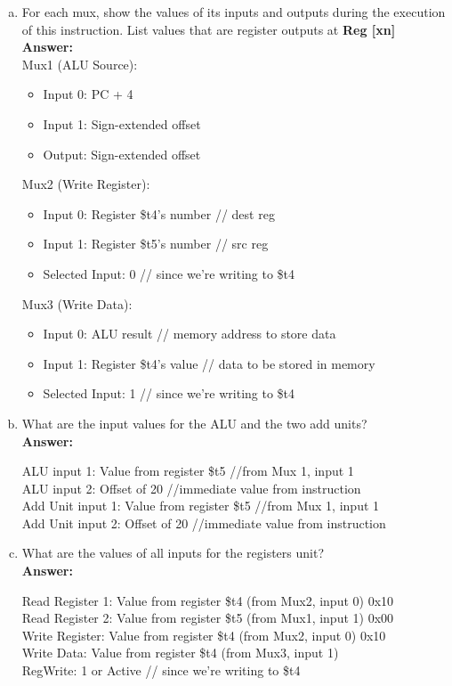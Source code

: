 \documentclass[11pt]{article}
\begin{document}
\begin{enumerate}[(a)]
    \item For each mux, show the values of its inputs and outputs during the execution of this instruction. List values that are register outputs at \textbf{Reg [xn]}\\
    \textbf{Answer:}\\[0.15in]
    Mux1 (ALU Source):
    \begin{itemize}
        \item Input 0: PC + 4
        \item Input 1: Sign-extended offset
        \item Output: Sign-extended offset
    \end{itemize}
    Mux2 (Write Register):
    \begin{itemize}
        \item Input 0: Register \$t4's number // dest reg
        \item Input 1: Register \$t5's number // src reg
        \item Selected Input: 0 // since we're writing to \$t4
    \end{itemize}
    Mux3 (Write Data):
    \begin{itemize}
        \item Input 0: ALU result // memory address to store data
        \item Input 1: Register \$t4's value // data to be stored in memory
        \item Selected Input: 1 // since we're writing to \$t4
    \end{itemize}

    \item What are the input values for the ALU and the two add units?\\
    \textbf{Answer:}
    \begin{center}
        ALU input 1: Value from register \$t5 //from Mux 1, input 1\\
        ALU input 2: Offset of 20 //immediate value from instruction\\
        Add Unit input 1: Value from register \$t5 //from Mux 1, input 1\\
        Add Unit input 2: Offset of 20 //immediate value from instruction\\
    \end{center}
    \item What are the values of all inputs for the registers unit?\\
    \textbf{Answer:}
    \begin{center}
        Read Register 1: Value from register \$t4 (from Mux2, input 0) 0x10\\
        Read Register 2: Value from register \$t5 (from Mux1, input 1) 0x00\\
        Write Register: Value from register \$t4 (from Mux2, input 0) 0x10\\
        Write Data: Value from register \$t4 (from Mux3, input 1)\\
        RegWrite: 1 or Active // since we're writing to \$t4\\
    \end{center}
\end{enumerate}
\end{document}
